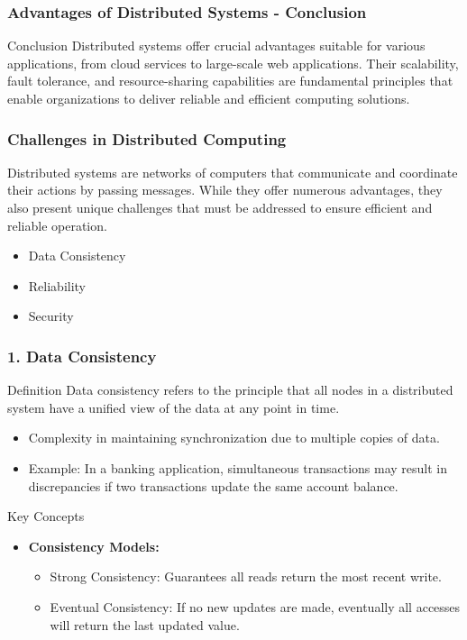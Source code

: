 \documentclass[aspectratio=169]{beamer}
\begin{document}
\begin{frame}[fragile]
    \frametitle{Advantages of Distributed Systems - Conclusion}
    \begin{block}{Conclusion}
        Distributed systems offer crucial advantages suitable for various applications, from cloud services to large-scale web applications. Their scalability, fault tolerance, and resource-sharing capabilities are fundamental principles that enable organizations to deliver reliable and efficient computing solutions.
    \end{block}
\end{frame}

\begin{frame}[fragile]
  \frametitle{Challenges in Distributed Computing}
  Distributed systems are networks of computers that communicate and coordinate their actions by passing messages. While they offer numerous advantages, they also present unique challenges that must be addressed to ensure efficient and reliable operation. 
  \begin{itemize}
      \item Data Consistency
      \item Reliability
      \item Security
  \end{itemize}
\end{frame}

\begin{frame}[fragile]
  \frametitle{1. Data Consistency}
  \begin{block}{Definition}
      Data consistency refers to the principle that all nodes in a distributed system have a unified view of the data at any point in time.
  \end{block}
  
  \begin{itemize}
      \item Complexity in maintaining synchronization due to multiple copies of data.
      \item Example: In a banking application, simultaneous transactions may result in discrepancies if two transactions update the same account balance.
  \end{itemize}

  \begin{block}{Key Concepts}
      \begin{itemize}
          \item \textbf{Consistency Models:}
          \begin{itemize}
              \item Strong Consistency: Guarantees all reads return the most recent write.
              \item Eventual Consistency: If no new updates are made, eventually all accesses will return the last updated value.
          \end{itemize}
      \end{itemize}
  \end{block}
\end{frame}
\end{document}
